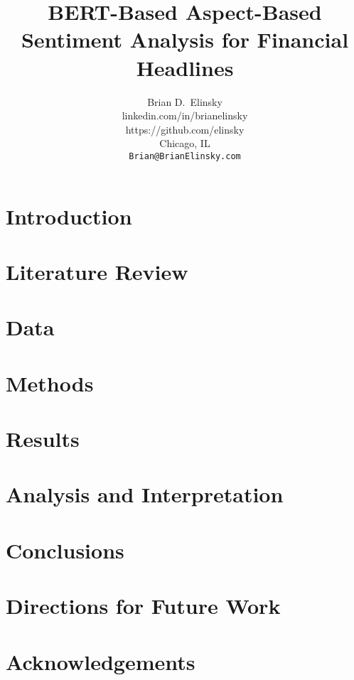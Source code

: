\documentclass[11pt,a4paper,titlepage]{article}
\title{BERT-Based Aspect-Based Sentiment Analysis for Financial Headlines}
\author{%
    Brian D.~Elinsky \\
    linkedin.com/in/brianelinsky\\
    https://github.com/elinsky\\
    Chicago, IL \\
    \texttt{Brian@BrianElinsky.com}
}
\begin{document}
    \maketitle

    \begin{abstract}
        
    \end{abstract}


    \section{Introduction}\label{sec:introduction}
    


    \section{Literature Review}\label{sec:literature-review}
    


    \section{Data}\label{sec:data}
    


    \section{Methods}\label{sec:methods}
    


    \section{Results}\label{sec:results}
    


    \section{Analysis and Interpretation}\label{sec:analysis-and-interpretation}
    


    \section{Conclusions}\label{sec:conclusions}
    


    \section{Directions for Future Work}\label{sec:directions-for-future-work}
    


    \section{Acknowledgements}\label{sec:acknowledgements}
    

    
\end{document}
